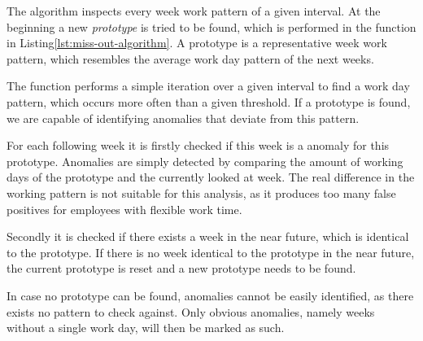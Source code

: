 The algorithm inspects every week work pattern of a given interval.
At the beginning a new \emph{prototype} is tried to be found, which is performed in the function  in Listing\ref{lst:miss-out-algorithm}.
A prototype is a representative week work pattern, which resembles the average work day pattern of the next weeks.

The function performs a simple iteration over a given interval to find a work day pattern, which occurs more often than a given threshold.
If a prototype is found, we are capable of identifying anomalies that deviate from this pattern.

For each following week it is firstly checked if this week is a anomaly for this prototype.
Anomalies are simply detected by comparing the amount of working days of the prototype and the currently looked at week.
The real difference in the working pattern is not suitable for this analysis, as it produces too many false positives for employees with flexible work time.

Secondly it is checked if there exists a week in the near future, which is identical to the prototype.
If there is no week identical to the prototype in the near future, the current prototype is reset and a new prototype needs to be found.

In case no prototype can be found, anomalies cannot be easily identified, as there exists no pattern to check against.
Only obvious anomalies, namely weeks without a single work day, will then be marked as such.
